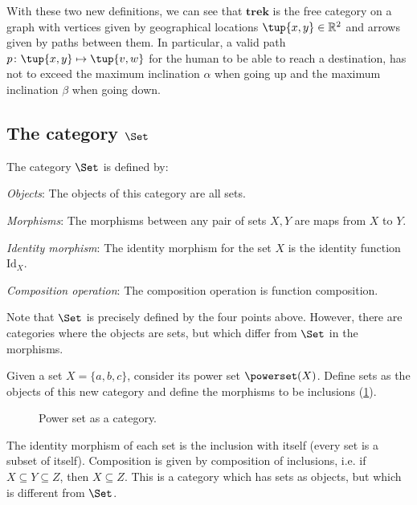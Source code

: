 With these two new definitions, we can see that $\mathbf{trek}$ is the free category on a graph with vertices given by geographical locations $\tup{x,y}\in \mathbb{R}^2$ and arrows given by paths between them. In particular, a valid path $p\colon \tup{x,y}\mapsto \tup{v,w}$ for the human to be able to reach a destination, has not to exceed the maximum inclination $\alpha$ when going up and the maximum inclination $\beta$ when going down.

\subsection{The category $\Set$}


\begin{shaded}
\begin{definition}
    The category $\Set$ is defined by:
    \begin{compactenum}
    \item \emph{Objects}: The objects of this category are all sets.
    \item \emph{Morphisms}: The morphisms between any pair of sets $X, Y$
    are maps from $X$ to $Y$.
    \item \emph{Identity morphism}: The identity morphism for the set $X$
    is the identity function $\text{Id}_X$.
    \item \emph{Composition operation}: The composition operation is function
    composition.
    \end{compactenum}
\end{definition}
\end{shaded}

Note that $\Set$ is precisely defined by the four points above. However, there are categories where the objects are sets, but which differ from $\Set$ in the morphisms.
\begin{example}
\label{ex:hasseinclusion}
Given a set $X=\{a,b,c\}$, consider its power set $\powerset(X)$. Define sets as the objects of this new category and define the morphisms to be inclusions (\cref{fig:powersetcat}).
\begin{figure}[h!]
\begin{center}
\end{center}
\caption{Power set as a category. \label{fig:powersetcat}}
\end{figure}
The identity morphism of each set is the inclusion with itself (every set is a subset of itself). Composition is given by composition of inclusions, i.e. if $X\subseteq Y \subseteq Z$, then $X\subseteq Z$. This is a category which has sets as objects, but which is different from $\Set$.
\end{example}
